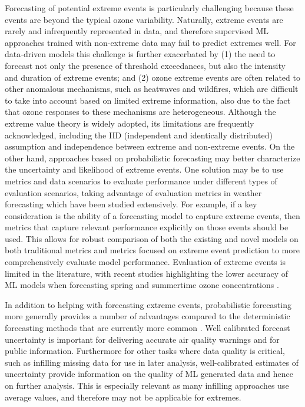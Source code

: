 \documentclass[gmd, manuscript]{copernicus}
\begin{document}
Forecasting of potential extreme events is particularly challenging because these events are beyond the typical ozone variability. Naturally, extreme events are rarely and infrequently represented in data, and therefore supervised ML approaches trained with non-extreme data may fail to predict extremes well. For data-driven models this challenge is further exacerbated by (1) the need to forecast not only the presence of threshold exceedances, but also the intensity and duration of extreme events; and (2) ozone extreme events are often related to other anomalous mechanisms, such as heatwaves and wildfires, which are difficult to take into account based on limited extreme information, also due to the fact that ozone responses to these mechanisms are heterogeneous. Although the extreme value theory is widely adopted, its limitations are frequently acknowledged, including the IID (independent and identically distributed) assumption and independence between extreme and non-extreme events. On the other hand, approaches based on probabilistic forecasting may better characterize the uncertainty and likelihood of extreme events. One solution may be to use metrics and data scenarios to evaluate performance under different types of evaluation scenarios, taking advantage of evaluation metrics in weather forecasting which have been studied extensively. For example, if a key consideration is the ability of a forecasting model to capture extreme events, then metrics that capture relevant performance explicitly on those events should be used. This allows for robust comparison of both the existing and novel models on both traditional metrics and metrics focused on extreme event prediction to more comprehensively evaluate model performance. Evaluation of extreme events is limited in the literature, with recent studies highlighting the lower accuracy of ML models when forecasting spring and summertime ozone concentrations \citep{leufen_o3resnet_2023, Hickman2023}.   

In addition to helping with forecasting extreme events, probabilistic forecasting more generally provides a number of advantages compared to the deterministic forecasting methods that are currently more common \citep{Bodnar2024}. Well calibrated forecast uncertainty is important for delivering accurate air quality warnings and for public information. Furthermore for other tasks where data quality is critical, such as infilling missing data for use in later analysis, well-calibrated estimates of uncertainty provide information on the quality of ML generated data and hence on further analysis. This is especially relevant as many infilling approaches use average values, and therefore may not be applicable for extremes. 
\end{document}
